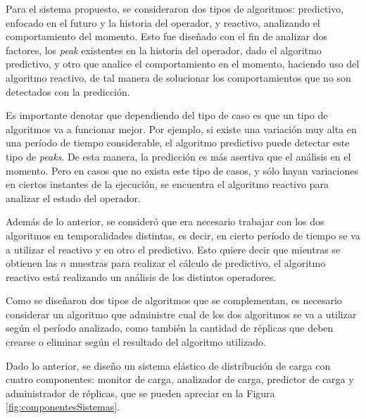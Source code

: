 Para el sistema propuesto, se consideraron dos tipos de algoritmos: predictivo, enfocado en el futuro y la historia del operador, y reactivo, analizando el comportamiento del momento. Esto fue diseñado con el fin de analizar dos factores, los \textit{peak} existentes en la historia del operador, dado el algoritmo predictivo, y otro que analice el comportamiento en el momento, haciendo uso del algoritmo reactivo, de tal manera de solucionar los comportamientos que no son detectados con la predicción.

Es importante denotar que dependiendo del tipo de caso es que un tipo de algoritmos va a funcionar mejor. Por ejemplo, si existe una variación muy alta en una período de tiempo considerable, el algoritmo predictivo puede detectar este tipo de \textit{peaks}. De esta manera, la predicción es más asertiva que el análisis en el momento. Pero en casos que no exista este tipo de casos, y sólo hayan variaciones en ciertos instantes de la ejecución, se encuentra el algoritmo reactivo para analizar el estado del operador.

Además de lo anterior, se consideró que era necesario trabajar con los dos algoritmos en temporalidades distintas, es decir, en cierto período de tiempo se va a utilizar el reactivo y en otro el predictivo. Esto quiere decir que mientras se obtienen las $n$ muestras para realizar el cálculo de predictivo, el algoritmo reactivo está realizando un análisis de los distintos operadores.


Como se diseñaron dos tipos de algoritmos que se complementan, es necesario considerar un algoritmo que administre cual de los dos algoritmos se va a utilizar según el período analizado, como también la cantidad de réplicas que deben crearse o eliminar según el resultado del algoritmo utilizado.

Dado lo anterior, se diseño un sistema elástico de distribución de carga con cuatro componentes: monitor de carga, analizador de carga, predictor de carga y administrador de réplicas, que se pueden apreciar en la Figura \ref{fig:componentesSistemas}.

